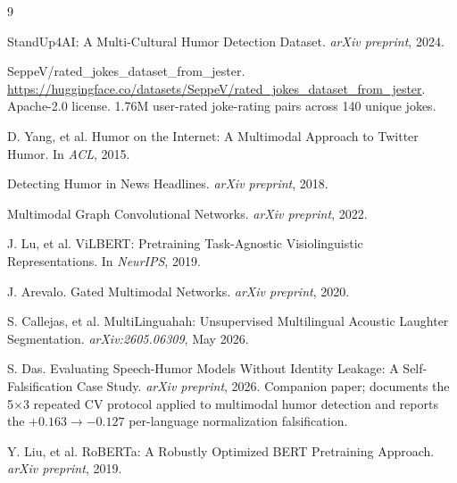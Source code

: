 \documentclass[11pt, letterpaper]{article}
\begin{document}
\begin{thebibliography}{9}

StandUp4AI: A Multi-Cultural Humor Detection Dataset.
\newblock \textit{arXiv preprint}, 2024.

SeppeV/rated\_jokes\_dataset\_from\_jester.
\newblock \url{https://huggingface.co/datasets/SeppeV/rated_jokes_dataset_from_jester}.
\newblock Apache-2.0 license. 1.76M user-rated joke-rating pairs across 140 unique jokes.

D. Yang, et al.
\newblock Humor on the Internet: A Multimodal Approach to Twitter Humor.
\newblock In \textit{ACL}, 2015.

Detecting Humor in News Headlines.
\newblock \textit{arXiv preprint}, 2018.

Multimodal Graph Convolutional Networks.
\newblock \textit{arXiv preprint}, 2022.

J. Lu, et al.
\newblock ViLBERT: Pretraining Task-Agnostic Visiolinguistic Representations.
\newblock In \textit{NeurIPS}, 2019.

J. Arevalo.
\newblock Gated Multimodal Networks.
\newblock \textit{arXiv preprint}, 2020.

S. Callejas, et al.
\newblock MultiLinguahah: Unsupervised Multilingual Acoustic Laughter Segmentation.
\newblock \textit{arXiv:2605.06309}, May 2026.

S. Das.
\newblock Evaluating Speech-Humor Models Without Identity Leakage: A Self-Falsification Case Study.
\newblock \textit{arXiv preprint}, 2026. Companion paper; documents the 5$\times$3 repeated CV protocol applied to multimodal humor detection and reports the $+0.163 \to -0.127$ per-language normalization falsification.

Y. Liu, et al.
\newblock RoBERTa: A Robustly Optimized BERT Pretraining Approach.
\newblock \textit{arXiv preprint}, 2019.

\end{thebibliography}
\end{document}

